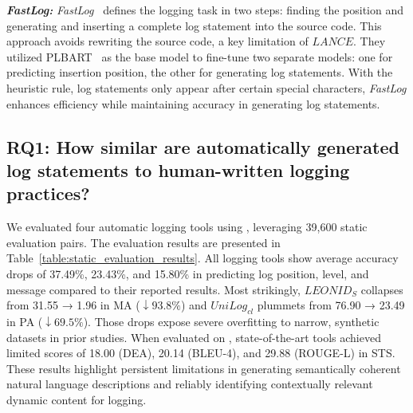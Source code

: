 \textit{\textbf{FastLog:}} \textit{FastLog}~\cite{xie2024fastlog} defines the logging task in two steps: finding the position and generating and inserting a complete log statement into the source code. This approach avoids rewriting the source code, a key limitation of \(LANCE\). They utilized PLBART~\cite{Ahmad2021UnifiedPF} as the base model to fine-tune two separate models: one for predicting insertion position, the other for generating log statements. With the heuristic rule, log statements only appear after certain special characters, \textit{FastLog} enhances efficiency while maintaining accuracy in generating log statements.


 
\subsection{RQ1: How similar are automatically generated log statements to human-written logging practices?}
\label{rq1}

We evaluated four automatic logging tools using \methodname, leveraging 39,600 static evaluation pairs.
The evaluation results are presented in Table~\ref{table:static_evaluation_results}. 
All logging tools show average accuracy drops of 37.49\%, 23.43\%, and 15.80\% in predicting log position, level, and message compared to their reported results. Most strikingly, \(LEONID_S\) collapses from 31.55 → 1.96 in MA (\(\downarrow93.8\%\)) and \(UniLog_{cl}\) plummets from 76.90 → 23.49 in PA (\(\downarrow69.5\%\)). Those drops expose severe overfitting to narrow, synthetic datasets in prior studies.
When evaluated on \methodname, state-of-the-art tools achieved limited scores of 18.00 (DEA), 20.14 (BLEU-4), and 29.88 (ROUGE-L) in STS. These results highlight persistent limitations in generating semantically coherent natural language descriptions and reliably identifying contextually relevant dynamic content for logging.


